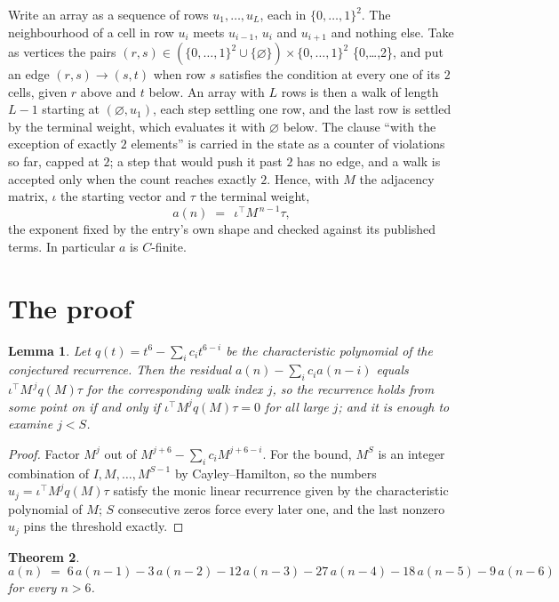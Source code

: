 \documentclass[11pt,a4paper]{article}
\theoremstyle{plain}
\newtheorem{theorem}{Theorem}
\newtheorem{lemma}[theorem]{Lemma}
\theoremstyle{definition}
\begin{document}
Write an array as a sequence of rows $u_1,\dots,u_L$, each in
$\{0,\dots,1\}^{2}$. The neighbourhood of a cell in row $u_i$ meets $u_{i-1}$,
$u_i$ and $u_{i+1}$ and nothing else. Take as vertices the pairs
$(r,s)\in(\{0,\dots,1\}^{2}\cup\{\varnothing\})\times\{0,\dots,1\}^{2}$ \times \{0,\dots,2\},
and put an edge $(r,s)\to(s,t)$ when row $s$ satisfies the condition at every one of its
$2$ cells, given $r$ above and $t$ below. An array with $L$ rows is then a walk of length
$L-1$ starting at $(\varnothing,u_1)$, each step settling one row, and the last row is
settled by the terminal weight, which evaluates it with $\varnothing$ below. The clause ``with the exception of exactly $2$ elements'' is carried in
the state as a counter of violations so far, capped at $2$; a step that would push it past
$2$ has no edge, and a walk is accepted only when the count reaches exactly $2$. Hence,
with $M$ the adjacency matrix, $\iota$ the starting vector and $\tau$ the terminal weight,
\[
a(n)\;=\;\,\iota^{\!\top}M^{\,n-1}\tau ,
\]
the exponent fixed by the entry's own shape and checked against its published terms. In
particular $a$ is $C$-finite.

\section{The proof}

\begin{lemma}\label{lem:crit}
Let $q(t)=t^{6}-\sum_i c_it^{6-i}$ be the characteristic polynomial of the
conjectured recurrence. Then the residual $a(n)-\sum_ic_ia(n-i)$ equals
$\iota^{\!\top}M^{\,j}q(M)\tau$ for the corresponding walk index $j$, so the
recurrence holds from some point on if and only if $\iota^{\!\top}M^{j}q(M)\tau=0$ for all
large $j$; and it is enough to examine $j<S$.
\end{lemma}

\begin{proof}
Factor $M^{j}$ out of $M^{j+6}-\sum_ic_iM^{j+6-i}$. For the bound, $M^{S}$
is an integer combination of $I,M,\dots,M^{S-1}$ by Cayley--Hamilton, so the numbers
$u_j=\iota^{\!\top}M^{j}q(M)\tau$ satisfy the monic linear recurrence given by the
characteristic polynomial of $M$; $S$ consecutive zeros force every later one, and the last
nonzero $u_j$ pins the threshold exactly.
\end{proof}

\begin{theorem}
\[
a(n)\;=\;6\,a(n-1) - 3\,a(n-2) - 12\,a(n-3) - 27\,a(n-4) - 18\,a(n-5) - 9\,a(n-6)
\]
for every $n>6$.
\end{theorem}
\end{document}

